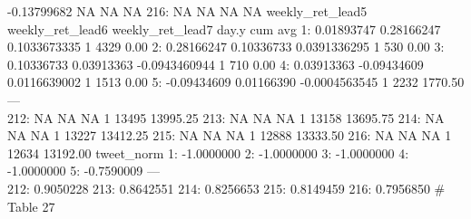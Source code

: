 \documentclass[
]{article}
\newenvironment{Shaded}{\begin{snugshade}}{\end{snugshade}}
\newcommand{\CommentTok}[1]{\textcolor[rgb]{0.56,0.35,0.01}{\textit{#1}}}
\newcommand{\ControlFlowTok}[1]{\textcolor[rgb]{0.13,0.29,0.53}{\textbf{#1}}}
\newcommand{\DataTypeTok}[1]{\textcolor[rgb]{0.13,0.29,0.53}{#1}}
\newcommand{\DecValTok}[1]{\textcolor[rgb]{0.00,0.00,0.81}{#1}}
\newcommand{\KeywordTok}[1]{\textcolor[rgb]{0.13,0.29,0.53}{\textbf{#1}}}
\newcommand{\NormalTok}[1]{#1}
\newcommand{\OperatorTok}[1]{\textcolor[rgb]{0.81,0.36,0.00}{\textbf{#1}}}
\newcommand{\StringTok}[1]{\textcolor[rgb]{0.31,0.60,0.02}{#1}}
\begin{document}
-0.13799682 NA NA NA 216: NA NA NA NA weekly\_ret\_lead5
weekly\_ret\_lead6 weekly\_ret\_lead7 day.y cum avg 1: 0.01893747
0.28166247 0.1033673335 1 4329 0.00 2: 0.28166247 0.10336733
0.0391336295 1 530 0.00 3: 0.10336733 0.03913363 -0.0943460944 1 710
0.00 4: 0.03913363 -0.09434609 0.0116639002 1 1513 0.00 5: -0.09434609
0.01166390 -0.0004563545 1 2232 1770.50 ---\\
212: NA NA NA 1 13495 13995.25 213: NA NA NA 1 13158 13695.75 214: NA NA
NA 1 13227 13412.25 215: NA NA NA 1 12888 13333.50 216: NA NA NA 1 12634
13192.00 tweet\_norm 1: -1.0000000 2: -1.0000000 3: -1.0000000 4:
-1.0000000 5: -0.7590009 ---\\
212: 0.9050228 213: 0.8642551 214: 0.8256653 215: 0.8149459 216:
0.7956850 \# Table 27

\begin{Shaded}
\end{Shaded}
\end{document}
